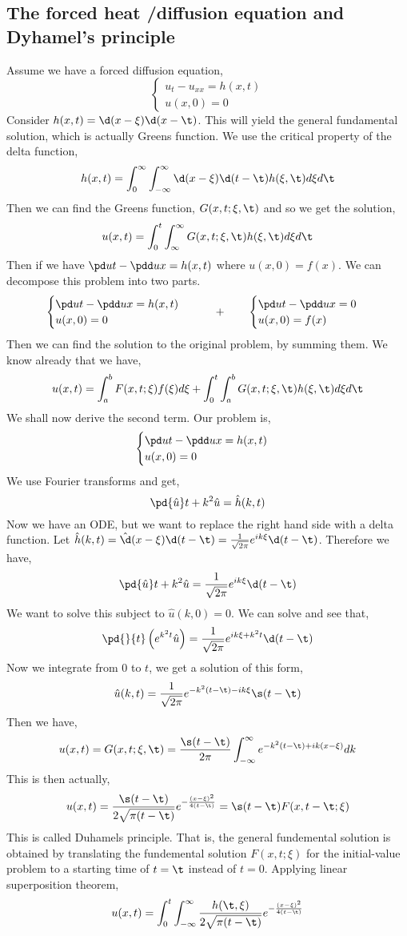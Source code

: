 \subsection{The forced heat /diffusion equation and Dyhamel's principle}
Assume we have a forced diffusion equation,
$$ \begin{cases}
  u_t - u_{xx} = h(x, t)\\
  u(x, 0) = 0
\end{cases} $$
Consider $h(x, t) = \d(x - \xi)\d(x - \t)$. This will yield the general fundamental solution, which is actually Greens function. We use the critical property of the delta function,
$$ h(x, t) = \int_0^\infty \int_{-\infty}^\infty \d(x - \xi)\d(t - \t)h(\xi, \t)d\xi d\t $$
Then we can find the Greens function, $G(x, t; \xi, \t)$ and so we get the solution,
$$ u(x, t) = \int_0^t \int_{\infty}^\infty G(x, t; \xi, \t) h(\xi, \t)d\xi d\t $$
Then if we have $\pd u t - \pdd u x = h(x, t)$ where $u(x, 0) = f(x)$. We can decompose this problem into two parts.
$$ \begin{cases}
  \pd u t - \pdd u x = h(x, t) \\
  u(x, 0) = 0
\end{cases} \qquad + \qquad \begin{cases}
  \pd u t - \pdd u x = 0 \\
  u(x, 0) = f(x)
\end{cases}$$
Then we can find the solution to the original problem, by summing them. We know already that we have,
$$ u(x, t) = \int_a^b F(x, t; \xi) f(\xi) d\xi + \int_0^t \int_a^b G(x, t; \xi, \t)h(\xi, \t) d\xi d\t$$
We shall now derive the second term. Our problem is,
$$ \begin{cases}
  \pd u t - \pdd u x = h(x, t) \\
  u(x, 0) = 0
\end{cases} $$
We use Fourier transforms and get,
$$ \pd {\hat u} t + k^2\hat u = \hat h(k, t) $$
Now we have an ODE, but we want to replace the right hand side with a delta function. Let $\hat h(k, t) = \hat \d (x - \xi) \d ( t - \t) = \frac{1}{\sqrt{2\pi}} e^{ik\xi}\d ( t - \t)$. Therefore we have,
$$ \pd {\hat u} t + k^2\hat u = \frac{1}{\sqrt{2\pi}} e^{ik\xi}\d ( t - \t) $$
We want to solve this subject to $\hat u (k, 0) = 0$. We can solve and see that,
$$ \pd{}{t}\left( e^{k^2t}\hat u \right) = \frac{1}{\sqrt{2\pi}} e^{ik\xi + k^2t} \d(t - \t) $$
Now we integrate from $0$ to $t$, we get a solution of this form,
$$ \hat u(k, t) = \frac{1}{\sqrt{2\pi}}e^{-k^2(t - \t) - ik\xi} \s(t - \t) $$
Then we have,
$$ u(x, t) = G(x, t; \xi, \t) = \frac{\s(t - \t)}{2\pi}\int_{-\infty}^\infty e^{-k^2(t - \t) + ik(x - \xi)}dk $$
This is then actually,
$$ u(x, t) = \frac{\s(t - \t)}{2\sqrt{\pi ( t - \t)}}e^{-\frac{(x - \xi)^2}{4(t - \t)}} = \s(t - \t)F(x, t - \t; \xi) $$
This is called Duhamels principle. That is, the general fundemental solution is obtained by translating the fundemental solution $F(x, t; \xi)$ for the initial-value problem to a starting time of $t = \t$ instead of $t = 0$. Applying linear superposition theorem,
$$ u(x, t) = \int_0^t \int_{-\infty}^\infty \frac{h(\t, \xi)}{2\sqrt{\pi(t - \t)}}e^{-\frac{(x - \xi)^2}{4(t - \t)}} $$

